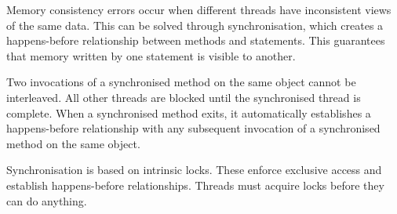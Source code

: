 Memory consistency errors occur when different threads have inconsistent views of the same data.
This can be solved through synchronisation, which creates a happens-before relationship between methods and statements.
This guarantees that memory written by one statement is visible to another.

Two invocations of a synchronised method on the same object cannot be interleaved.
All other threads are blocked until the synchronised thread is complete.
When a synchronised method exits, it automatically establishes a happens-before relationship with any subsequent invocation of a synchronised method on the same object.

Synchronisation is based on intrinsic locks.
These enforce exclusive access and establish happens-before relationships.
Threads must acquire locks before they can do anything.

